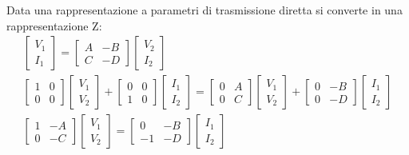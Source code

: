 \documentclass{article}
\numberwithin{equation}{subsection}
\begin{document}
Data una rappresentazione a parametri di trasmissione diretta si converte in una rappresentazione Z:
\begin{gather*}
    \begin{bmatrix}
        V_1\\I_1
    \end{bmatrix}=\begin{bmatrix}
        A&-B\\C&-D
    \end{bmatrix}\begin{bmatrix}
        V_2\\I_2
    \end{bmatrix}\\
    \begin{bmatrix}
        1&0\\0&0
    \end{bmatrix}\begin{bmatrix}
        V_1\\V_2
    \end{bmatrix}+\begin{bmatrix}
        0&0\\1&0
    \end{bmatrix}\begin{bmatrix}
        I_1\\I_2
    \end{bmatrix}=\begin{bmatrix}
        0&A\\0&C
    \end{bmatrix}\begin{bmatrix}
        V_1\\V_2
    \end{bmatrix}+\begin{bmatrix}
        0&-B\\0&-D
    \end{bmatrix}\begin{bmatrix}
        I_1\\I_2
    \end{bmatrix}\\
    \begin{bmatrix}
        1&-A\\0&-C
    \end{bmatrix}\begin{bmatrix}
        V_1\\V_2
    \end{bmatrix}=\begin{bmatrix}
        0&-B\\-1&-D
    \end{bmatrix}\begin{bmatrix}
        I_1\\I_2
    \end{bmatrix}
\end{gather*}
\end{document}
